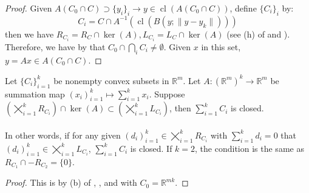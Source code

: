 \begin{proof}
	Given $A(C_0\cap C)\supset\{y_i\}_{i}\to y\in \operatorname{cl}(A(C_0\cap C))$, define $\{C_i\}_i$ by:
	\[
		C_i=C\cap A^{-1}\left(\operatorname{cl}\left(B(y;\|y-y_k\|) \right)\right)
	\]
	then we have $R_{C_i}=R_C\cap \operatorname{ker}(A),L_{C_i}=L_C\cap \operatorname{ker}(A)$ (see (h) of  and ). Therefore, we have by  that $C_0\cap \bigcap_iC_i\neq\emptyset$. Given $x$ in this set, $y=Ax\in A(C_0\cap C)$.
\end{proof}

\begin{coro}\label{coro:014-closed-sum}
	Let $\{C_i\}_{i=1}^k$ be nonempty convex subsets in $\mathbb{R}^m$. Let $A:(\mathbb{R}^{m})^k\to \mathbb{R}^m$ be summation map $(x_i)_{i=1}^k\mapsto \sum_{i=1}^kx_i$. Suppose $\left(\bigtimes_{i=1}^kR_{C_i}\right)\cap\operatorname{ker}(A)\subset \left(\bigtimes_{i=1}^kL_{C_i}\right)$, then $\sum_{i=1}^kC_i$ is closed.
\end{coro}

\paragraph{}In other words, if for any given $(d_i)_{i=1}^k\in\bigtimes_{i=1}^kR_{C_i}$ with $\sum_{i=1}^kd_i=0$ that $(d_i)_{i=1}^k\in\bigtimes_{i=1}^kL_{C_i}$, $\sum_{i=1}^kC_i$ is closed. If $k=2$, the condition is the same as $R_{C_1}\cap -R_{C_2}=\{0\}$.

\begin{proof}
	This is by (b) of , , and  with $C_0=\mathbb{R}^{mk}$.
\end{proof}

